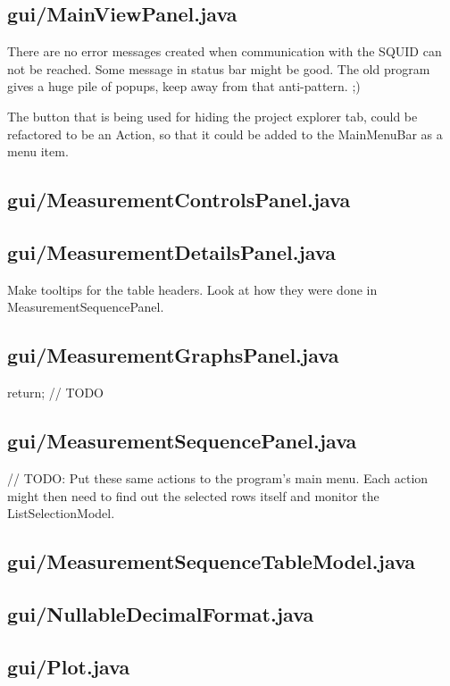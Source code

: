 \subsection{gui/MainViewPanel.java}

There are no error messages created when communication with the SQUID can not be reached. Some message in status bar might be good. The old program gives a huge pile of popups, keep away from that anti-pattern. ;)

The button that is being used for hiding the project explorer tab, could be refactored to be an Action, so that it could be added to the MainMenuBar as a menu item.


\subsection{gui/MeasurementControlsPanel.java}

\subsection{gui/MeasurementDetailsPanel.java}

Make tooltips for the table headers. Look at how they were done in MeasurementSequencePanel.


\subsection{gui/MeasurementGraphsPanel.java}
        return; // TODO

\subsection{gui/MeasurementSequencePanel.java}
        // TODO: Put these same actions to the program's main menu. Each action might then need to find out the selected rows itself and monitor the ListSelectionModel.

\subsection{gui/MeasurementSequenceTableModel.java}

\subsection{gui/NullableDecimalFormat.java}

\subsection{gui/Plot.java}

